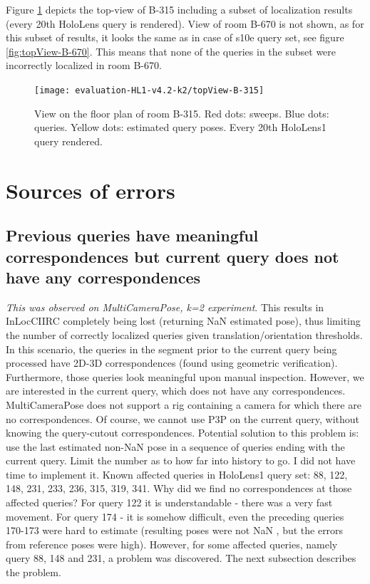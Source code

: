 \documentclass[twoside]{ctuthesis}
\theoremstyle{plain}
\theoremstyle{definition}
\theoremstyle{note}
\newcommand{\code}[1]{{\ttfamily #1%
}}
\begin{document}
Figure \ref{fig:HL1-topView-B-315} depicts the top-view of B-315 including a subset of localization results (every 20th HoloLens query is rendered). View of room B-670 is not shown, as for this subset of results, it looks the same as in case of s10e query set, see figure \ref{fig:topView-B-670}. This means that none of the queries in the subset were incorrectly localized in room B-670.

\begin{figure}[htb!]
	\centering
 	\texttt{[image: evaluation-HL1-v4.2-k2/topView-B-315]}
 	\caption[HoloLens1 B-315 top-view]{View on the floor plan of room B-315. Red dots: sweeps. Blue dots: queries. Yellow dots: estimated query poses. Every 20th HoloLens1 query rendered.}
 	\label{fig:HL1-topView-B-315}
\end{figure} 

\section{Sources of errors}
\label{section:sources-of-errors}

\subsection{Previous queries have meaningful correspondences but current query does not have any correspondences}
\emph{This was observed on MultiCameraPose, k=2 experiment}. This results in InLocCIIRC completely being lost (returning \code{NaN} estimated pose), thus limiting the number of correctly localized queries given translation/orientation thresholds. In this scenario, the queries in the segment prior to the current query being processed have 2D-3D correspondences (found using geometric verification). Furthermore, those queries look meaningful upon manual inspection. However, we are interested in the current query, which does not have any correspondences. \code{MultiCameraPose} does not support a rig containing a camera for which there are no correspondences. Of course, we cannot use P3P on the current query, without knowing the query-cutout correspondences. Potential solution to this problem is: use the last estimated non-\code{NaN} pose in a sequence of queries ending with the current query. Limit the number as to how far into history to go. I did not have time to implement it. Known affected queries in HoloLens1 query set: 88, 122, 148, 231, 233, 236, 315, 319, 341. Why did we find no correspondences at those affected queries? For query 122 it is understandable - there was a very fast movement. For query 174 - it is somehow difficult, even the preceding queries 170-173 were hard to estimate (resulting poses were not \code{NaN}, but the errors from reference poses were high). However, for some affected queries, namely query 88, 148 and 231, a problem was discovered. The next subsection describes the problem.
\end{document}
